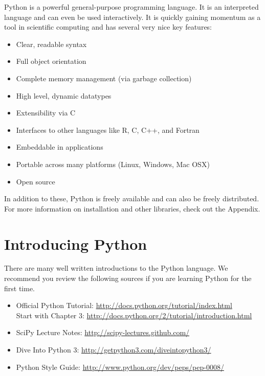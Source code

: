 \label{lab:Essential_Python}

Python is a powerful general-purpose programming language. It is an interpreted
language and can even be used interactively. 
It is quickly gaining momentum as a tool in scientific computing and has several very
nice key features:
\begin{itemize}
\item Clear, readable syntax
\item Full object orientation
\item Complete memory management (via garbage collection)
\item High level, dynamic datatypes
\item Extensibility via C
\item Interfaces to other languages like R, C, C++, and Fortran
\item Embeddable in applications
\item Portable across many platforms (Linux, Windows, Mac OSX)
\item Open source

\end{itemize}
In addition to these, Python is freely available and can also be freely distributed.
For more information on installation and other libraries, check out the Appendix.


\section*{Introducing Python}
There are many well written introductions to the Python language.
We recommend you review the following sources if you are learning Python for the
first time.

\begin{itemize}
\item Official Python Tutorial: \url{http://docs.python.org/tutorial/index.html} \\
      Start with Chapter 3: \url{http://docs.python.org/2/tutorial/introduction.html}
\item SciPy Lecture Notes: \url{http://scipy-lectures.github.com/}
\item Dive Into Python 3: \url{http://getpython3.com/diveintopython3/}
\item Python Style Guide: \url{http://www.python.org/dev/peps/pep-0008/}
\end{itemize}

